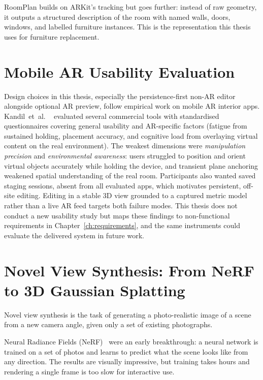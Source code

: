 RoomPlan builds on ARKit's tracking but goes further: instead of raw
geometry, it outputs a structured description of the room with named
walls, doors, windows, and labelled furniture instances. This is the
representation this thesis uses for furniture replacement.

\section{Mobile AR Usability Evaluation}
\label{sec:soa:usability}

Design choices in this thesis, especially the persistence-first non-AR editor
alongside optional AR preview, follow empirical work on mobile AR interior
apps. Kandil~et~al. ~\cite{kandil2021ux} evaluated several commercial tools with
standardised questionnaires covering general usability and AR-specific factors
(fatigue from sustained holding, placement accuracy, and cognitive load from
overlaying virtual content on the real environment). The weakest dimensions
were \emph{manipulation precision} and \emph{environmental awareness}: users
struggled to position and orient virtual objects accurately while holding the
device, and transient plane anchoring weakened spatial understanding of the
real room. Participants also wanted saved staging sessions, absent from all
evaluated apps, which motivates persistent, off-site editing.
Editing in a stable 3D view grounded to a captured metric model rather than a
live AR feed targets both failure modes. This thesis does not conduct a new
usability study but maps these findings to non-functional requirements in
Chapter~\ref{ch:requirements}, and the same instruments could evaluate the
delivered system in future work.

\section{Novel View Synthesis: From NeRF to 3D Gaussian Splatting}
\label{sec:soa:nvs}

Novel view synthesis is the task of generating a photo-realistic image of
a scene from a new camera angle, given only a set of existing photographs.

Neural Radiance Fields (NeRF)~\cite{mildenhall2020nerf} were an early
breakthrough: a neural network is trained on a set of photos and learns
to predict what the scene looks like from any direction. The results are
visually impressive, but training takes hours and rendering a single frame
is too slow for interactive use. 


